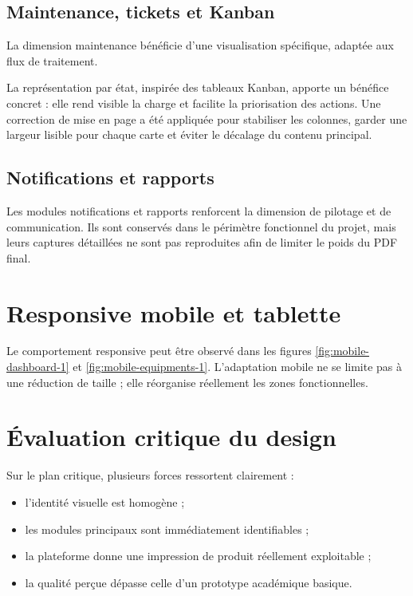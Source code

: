 \subsection{Maintenance, tickets et Kanban}
La dimension maintenance bénéficie d'une visualisation spécifique, adaptée aux flux de traitement.


La représentation par état, inspirée des tableaux Kanban, apporte un bénéfice concret : elle rend visible la charge et facilite la priorisation des actions. Une correction de mise en page a été appliquée pour stabiliser les colonnes, garder une largeur lisible pour chaque carte et éviter le décalage du contenu principal.

\subsection{Notifications et rapports}
Les modules notifications et rapports renforcent la dimension de pilotage et de communication.
Ils sont conservés dans le périmètre fonctionnel du projet, mais leurs captures détaillées ne sont pas reproduites afin de limiter le poids du PDF final.

\section{Responsive mobile et tablette}
Le comportement responsive peut être observé dans les figures \ref{fig:mobile-dashboard-1} et \ref{fig:mobile-equipments-1}. L'adaptation mobile ne se limite pas à une réduction de taille ; elle réorganise réellement les zones fonctionnelles.



\section{Évaluation critique du design}
Sur le plan critique, plusieurs forces ressortent clairement :
\begin{itemize}
  \item l'identité visuelle est homogène ;
  \item les modules principaux sont immédiatement identifiables ;
  \item la plateforme donne une impression de produit réellement exploitable ;
  \item la qualité perçue dépasse celle d'un prototype académique basique.
\end{itemize}

